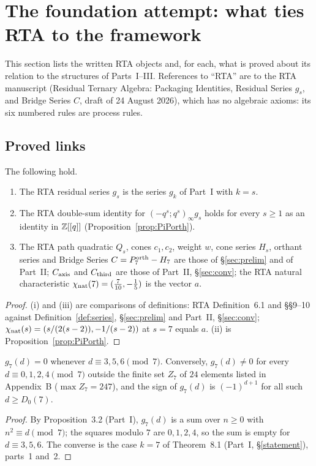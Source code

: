 \section{The foundation attempt: what ties RTA to the framework}\label{sec:found}
This section lists the written RTA objects and, for each, what is proved about its relation to the structures of Parts~I--III.
References to ``RTA'' are to the RTA manuscript (Residual Ternary Algebra: Packaging Identities, Residual Series $g_s$, and Bridge Series $C$, draft of
24 August 2026), which has no algebraic axioms: its six numbered rules are process rules.

\subsection{Proved links}
\begin{proposition}\label{prop:ident}
The following hold.
\begin{enumerate}[label=(\roman*)]
\item The RTA residual series $g_s$ is the series $g_k$ of Part~I with $k=s$.
\item The RTA double-sum identity for $(-q^s;q^s)_\infty g_s$ holds for every $s\ge1$ as an identity in $\mathbb{Z}[[q]]$ (Proposition~\ref{prop:PiPorth}).
\item The RTA path quadratic $Q_s$, cones $c_1,c_2$, weight $w$, cone series $H_s$, orthant series and Bridge Series $C=P^{\mathrm{orth}}_7-H_7$ are those of
\S\ref{sec:prelim} and of Part~II; $C_{\mathrm{axis}}$ and $C_{\mathrm{third}}$ are those of Part~II, \S\ref{sec:conv}; the RTA natural characteristic $\chi_{\rm nat}(7)=(\tfrac7{10},-\tfrac15)$ is the vector $a$.
\end{enumerate}
\end{proposition}
\begin{proof}
(i) and (iii) are comparisons of definitions: RTA Definition~6.1 and \S\S9--10 against Definition~\ref{def:series}, \S\ref{sec:prelim} and Part~II, \S\ref{sec:conv};
$\chi_{\rm nat}(s)=(s/(2(s-2)),-1/(s-2))$ at $s=7$ equals $a$. (ii) is Proposition~\ref{prop:PiPorth}.
\end{proof}

\begin{corollary}\label{cor:g7res}
$g_7(d)=0$ whenever $d\equiv3,5,6\pmod7$. Conversely, $g_7(d)\ne0$ for every $d\equiv0,1,2,4\pmod 7$ outside the finite set $Z_7$ of $24$ elements listed in
Appendix~B ($\max Z_7=247$), and the sign of $g_7(d)$ is $(-1)^{d+1}$ for all such $d\ge D_0(7)$.
\end{corollary}
\begin{proof}
By Proposition~3.2 (Part~I), $g_7(d)$ is a sum over $n\ge0$ with $n^2\equiv d\pmod 7$; the squares modulo $7$ are $0,1,2,4$, so the sum is empty for $d\equiv3,5,6$.
The converse is the case $k=7$ of Theorem~8.1 (Part~I, \S\ref{statement}), parts~1 and~2.
\end{proof}

